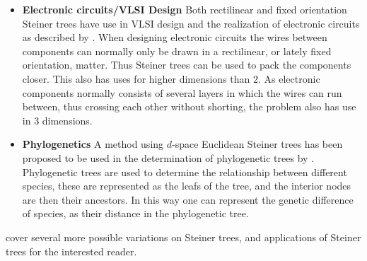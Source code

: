 \begin{itemize}
\item \textbf{Electronic circuits/VLSI Design} \quad Both rectilinear and fixed
  orientation Steiner trees have use in VLSI design and the realization of
  electronic circuits as described by
  \textcite[sec.~2.7,sec~3.6]{brazil2015}. When designing electronic circuits
  the wires between components can normally only be drawn in a rectilinear, or
  lately fixed orientation, matter. Thus Steiner trees can be used to pack the
  components closer. This also has uses for higher dimensions than $2$. As
  electronic components normally consists of several layers in which the wires
  can run between, thus crossing each other without shorting, the problem also
  has use in $3$ dimensions.
\item \textbf{Phylogenetics} \quad A method using $d$-space Euclidean Steiner trees
  has been proposed to be used in the determination of phylogenetic trees by
  \textcite{brazil2009}. Phylogenetic trees are used to determine the
  relationship between different species, these are represented as the leafs of
  the tree, and the interior nodes are then their ancestors. In this way one can
  represent the genetic difference of species, as their distance in the
  phylogenetic tree.
\end{itemize}
%
\textcite{brazil2015} cover several more possible variations on Steiner trees,
and applications of Steiner trees for the interested reader.


